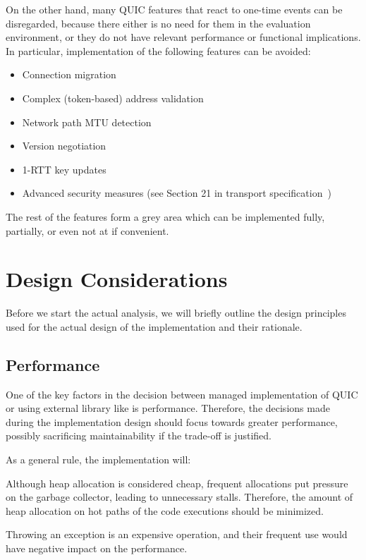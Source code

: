 On the other hand, many QUIC features that react to one-time events can be disregarded, because
there either is no need for them in the evaluation environment, or they do not have relevant
performance or functional implications. In particular, implementation of the following features can
be avoided:

\begin{itemize}

    \item Connection migration

    \item Complex (token-based) address validation

    \item Network path MTU detection

    \item Version negotiation

    \item 1-RTT key updates

    \item Advanced security measures (see Section 21 in transport specification~\cite{draft-ietf-quic-transport})

\end{itemize}

The rest of the features form a grey area which can be implemented fully, partially, or even not at
if convenient.

\section{Design Considerations}

Before we start the actual analysis, we will briefly outline the design principles used for the
actual design of the implementation and their rationale.

\subsection{Performance}

One of the key factors in the decision between managed \dotnet{} implementation of QUIC or using
external library like \libmsquic{} is performance. Therefore, the decisions made during the
implementation design should focus towards greater performance, possibly sacrificing maintainability
if the trade-off is justified.

As a general rule, the implementation will:

\begin{itemize}

     Although heap allocation is considered cheap, frequent
    allocations put pressure on the \dotnet{} garbage collector, leading to unnecessary stalls.
    Therefore, the amount of heap allocation on hot paths of the code executions should be
    minimized.

     Throwing an exception is an expensive operation, and
    their frequent use would have negative impact on the performance.

\end{itemize}

